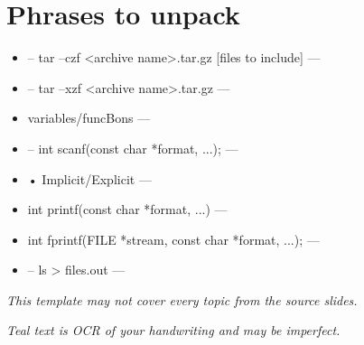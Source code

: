 \documentclass[12pt]{article}
\begin{document}
\section*{Phrases to unpack}
\begin{itemize}[leftmargin=*]
  \item – tar –czf <archive name>.tar.gz [files to include] --- \hrulefill
  \vspace{1.1em}
  \item – tar –xzf <archive name>.tar.gz --- \hrulefill
  \vspace{1.1em}
  \item variables/funcBons --- \hrulefill
  \vspace{1.1em}
  \item – int scanf(const char *format, ...); --- \hrulefill
  \vspace{1.1em}
  \item • Implicit/Explicit --- \hrulefill
  \vspace{1.1em}
  \item int printf(const char *format, ...) --- \hrulefill
  \vspace{1.1em}
  \item int fprintf(FILE *stream, const char *format, ...); --- \hrulefill
  \vspace{1.1em}
  \item – ls > files.out --- \hrulefill
  \vspace{1.1em}
\end{itemize}
\vspace{2em}
\begin{center}
\textit{This template may not cover every topic from the source slides.}
\end{center}
\vspace{1em}
\begin{center}
\textit{Teal text is OCR of your handwriting and may be imperfect.}
\end{center}
\end{document}
